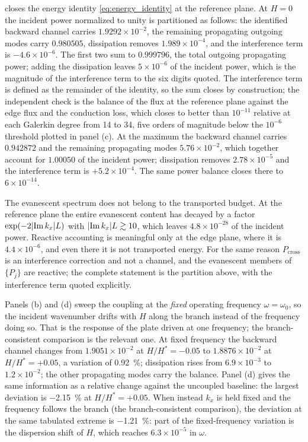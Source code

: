  closes the energy identity \eqref{eq:energy_identity} at the
reference plane.  At $H=0$ the incident power normalized to unity is partitioned
as follows: the identified backward channel carries $1.9292\times10^{-2}$, the
remaining propagating outgoing modes carry $0.980505$, dissipation removes
$1.989\times10^{-4}$, and the interference term is $-4.6\times10^{-6}$.  The
first two sum to $0.999796$, the total outgoing propagating power; adding the
dissipation leaves $5\times10^{-6}$ of the incident power, which is the magnitude of the interference term to the six digits quoted.  The
interference term is defined as the remainder of the identity, so the sum closes
by construction; the independent check is the balance of the flux at the
reference plane against the edge flux and the conduction loss, which closes to
better than $10^{-11}$ relative at each Galerkin degree from 14 to 34, five
orders of magnitude below the $10^{-6}$ threshold plotted in panel (c).  At the maximum
the backward channel carries $0.942872$ and the remaining propagating modes
$5.76\times10^{-2}$, which together account for $1.00050$ of the incident
power; dissipation removes $2.78\times10^{-5}$ and the interference term is
$+5.2\times10^{-4}$.  The same power balance closes there to
$6\times10^{-14}$.

The evanescent spectrum does not belong to the transported budget.  At the
reference plane the entire evanescent content has decayed by a factor
$\exp(-2|{\operatorname{Im} k_x}|L)$ with $|{\operatorname{Im} k_x}|L\gtrsim10$, which leaves
$4.8\times10^{-28}$ of the incident power.  Reactive accounting is meaningful
only at the edge plane, where it is $4.4\times10^{-6}$, and even there it
is not transported energy.  For the same reason $P_{\text{cross}}$ is an
interference correction and not a channel, and the evanescent members of
$\{P_j\}$ are reactive; the complete statement is the partition above, with the
interference term quoted explicitly.

Panels (b) and (d) sweep the coupling at the \emph{fixed} operating frequency
$\omega=\omega_0$, so the incident wavenumber drifts with $H$ along the branch
instead of the frequency doing so.  That is the response of the plate driven at
one frequency; the branch-consistent comparison is the relevant one.  At
fixed frequency the backward channel changes from $1.9051\times10^{-2}$ at
$H/H^{*}=-0.05$ to $1.8876\times10^{-2}$ at $H/H^{*}=+0.05$, a variation of
\SI{0.92}{\percent}; dissipation rises from $6.9\times10^{-3}$ to
$1.2\times10^{-2}$; the other propagating modes carry the balance.  Panel (d)
gives the same information as a relative change against the uncoupled baseline:
the largest deviation is \SI{-2.15}{\percent} at $H/H^{*}=+0.05$.  When instead
$k_x$ is held fixed and the frequency follows the branch (the branch-consistent comparison), the deviation at the same tabulated extreme is
\SI{-1.21}{\percent}: part of the fixed-frequency variation is the dispersion
shift of $H$, which reaches $6.3\times10^{-5}$ in $\omega$.

